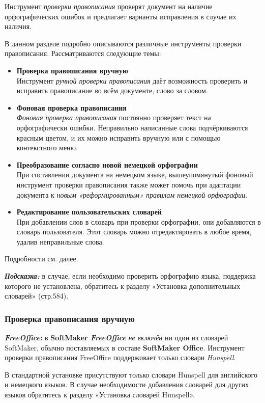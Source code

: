 ﻿\documentclass[a4paper,10pt]{article}
\begin{document}
Инструмент \textit{проверки правописания} проверят документ на наличие орфографических ошибок и предлагает варианты исправления в случае их наличия.

В данном разделе подробно описываются различные инструменты проверки правописания. Рассматриваются следующие темы:

\begin{itemize}
 \item \textbf{Проверка правописания вручную}\\
 Инструмент \textit{ручной проверки правописания} даёт возможность проверить и исправить правописание во всём документе, слово за словом.
 \item \textbf{Фоновая проверка правописания}\\
 \textit{Фоновая проверка правописания} постоянно проверяет текст на орфографически ошибки. Неправильно написанные слова подчёркиваются красным цветом, и их можно исправить вручную или с помощью контекстного меню.
 \item \textbf{Преобразование согласно новой немецкой орфографии}\\
 При составлении документа на немецком языке, вышеупомянутый фоновый инструмент проверки правописания также может помочь при адаптации документа к \textit{новым «реформированным» правилам немецкой орфографии}.
 \item \textbf{Редактирование пользовательских словарей}\\
 При добавлении слов в словарь при проверки орфографии, они добавляются в словарь пользователя. Этот словарь можно отредактировать в любое время, удалив неправильные слова.
\end{itemize}

Подробности см. далее.

\begin{mdframed}[backgroundcolor=blue!10]
\textbf{\textit{Подсказка:}} в случае, если необходимо проверить орфографию языка, поддержка которого не установлена, обратитесь к разделу «Установка дополнительных словарей» (стр.584).
\end{mdframed}

\subsubsection{Проверка правописания вручную}
\begin{mdframed}[backgroundcolor=pink!50]
\textbf{\textit{FreeOffice}:} в \textbf{SoftMaker \textit{FreeOffice}} \textit{не включён} ни один из словарей SoftMaker, обычно поставляемых в составе \textbf{SoftMaker Office}. Инструмент проверки правописания FreeOffice поддерживает только словари \textit{Hunspell}.

В стандартной установке присутствуют только словари Hunspell для английского и немецкого языков. В случае необходимости добавления словарей для других языков обратитесь к разделу «Установка словарей Hunspell».
\end{mdframed}
\end{document}

